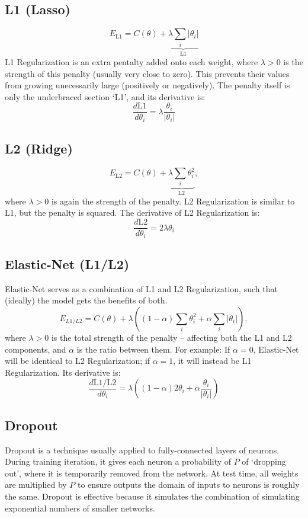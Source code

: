 \documentclass[fleqn]{article}
\begin{document}
\subsection{L1 (Lasso)}
\[ E_\text{L1} = C(\theta) +
\underbrace{\lambda{\sum}_i |\theta_i|}_\text{L1} \]
L1 Regularization is an extra pentalty added onto each weight, where
$\lambda > 0$ is the strength of this penalty (usually very close to zero).
This prevents their values from growing unecessarily large (positively or
negatively). The penalty itself is only the underbraced section `L1', and its
derivative is:
\[ \frac{d \text{L1}}{d \theta_i} = \lambda \frac{\theta_i}{|\theta_i|} \]

\subsection{L2 (Ridge)}
\[ E_\text{L2} = C(\theta) +
\underbrace{\lambda{\sum}_i \theta_i^2}_\text{L2}, \]
where $\lambda > 0$ is again the strength of the penalty. L2 Regularization is
similar to L1, but the penalty is squared. The derivative of L2
Regularization is:
\[ \frac{d \text{L2}}{d \theta_i} = 2 \lambda \theta_i \]

\subsection{Elastic-Net (L1/L2)}

Elastic-Net serves as a combination of L1 and L2 Regularization, such that
(ideally) the model gets the benefits of both.
\[ E_{L1/L2} = C(\theta) + \lambda(
	(1 - \alpha){\sum}_i \theta_i^2 +
	\alpha{\sum}_i |\theta_i|
), \]
where $\lambda > 0$ is the total strength of the penalty -- affecting both the 
L1 and L2 components, and $\alpha$ is the ratio between them. For example:
If $\alpha=0$, Elastic-Net will be identical to L2 Regularization; if
$\alpha=1$, it will instead be L1 Regularization. Its derivative is:
\[ \frac{d \text{L1/L2}}{d \theta_i} =
\lambda((1-\alpha) 2\theta_i + \alpha\frac{\theta_i}{|\theta_i|}) \]

\subsection{Dropout}
Dropout is a technique usually applied to fully-connected layers of
neurons. During training iteration, it gives each neuron a probability of
$P$ of `dropping out', where it is temporarily removed from the network.
At test time, all weights are multiplied by $P$ to ensure outputs the
domain of inputs to neurons is roughly the same. Dropout is effective
because it simulates the combination of simulating exponential numbers of
smaller networks.
\end{document}
